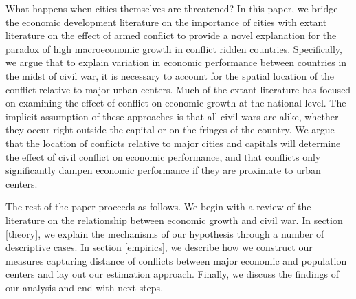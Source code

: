 
What happens when cities themselves are threatened? In this paper, we bridge the economic development literature on the importance of cities with extant literature on the effect of armed conflict to provide a novel explanation for the paradox of high macroeconomic growth in conflict ridden countries. Specifically, we argue that to explain variation in economic performance between countries in the midst of civil war, it is necessary to account for the spatial location of the conflict relative to major urban centers. Much of the extant literature has focused on examining the effect of conflict on economic growth at the national level. The implicit assumption of these approaches is that all civil wars are alike, whether they occur right outside the capital or on the fringes of the country. We argue that the location of conflicts relative to major cities and capitals will determine the effect of civil conflict on economic performance, and that conflicts only significantly dampen economic performance if they are proximate to urban centers. 

The rest of the paper proceeds as follows.  We begin with a review of the literature on the relationship between economic growth and civil war. In section \ref{theory}, we explain the mechanisms of our hypothesis through a number of descriptive cases. In section \ref{empirics}, we describe how we construct our measures capturing distance of conflicts between major economic and population centers and lay out our estimation approach. Finally, we discuss the findings of our analysis and end with next steps. 